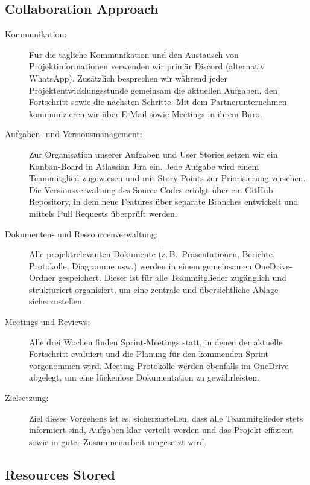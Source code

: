\documentclass{article}
\begin{document}
\subsection{Collaboration Approach}
\begin{description}
  \item[Kommunikation:] Für die tägliche Kommunikation und den Austausch von Projektinformationen verwenden wir primär Discord (alternativ WhatsApp). Zusätzlich besprechen wir während jeder Projektentwicklungsstunde gemeinsam die aktuellen Aufgaben, den Fortschritt sowie die nächsten Schritte. Mit dem Partnerunternehmen kommunizieren wir über E-Mail sowie Meetings in ihrem Büro.

  \item[Aufgaben- und Versionsmanagement:] Zur Organisation unserer Aufgaben und User Stories setzen wir ein Kanban-Board in Atlassian Jira ein. Jede Aufgabe wird einem Teammitglied zugewiesen und mit Story Points zur Priorisierung versehen. Die Versionsverwaltung des Source Codes erfolgt über ein GitHub-Repository, in dem neue Features über separate Branches entwickelt und mittels Pull Requests überprüft werden.

  \item[Dokumenten- und Ressourcenverwaltung:] Alle projektrelevanten Dokumente (z.\,B.\ Präsentationen, Berichte, Protokolle, Diagramme usw.) werden in einem gemeinsamen OneDrive-Ordner gespeichert. Dieser ist für alle Teammitglieder zugänglich und strukturiert organisiert, um eine zentrale und übersichtliche Ablage sicherzustellen.

  \item[Meetings und Reviews:] Alle drei Wochen finden Sprint-Meetings statt, in denen der aktuelle Fortschritt evaluiert und die Planung für den kommenden Sprint vorgenommen wird. Meeting-Protokolle werden ebenfalls im OneDrive abgelegt, um eine lückenlose Dokumentation zu gewährleisten.

  \item[Zielsetzung:] Ziel dieses Vorgehens ist es, sicherzustellen, dass alle Teammitglieder stets informiert sind, Aufgaben klar verteilt werden und das Projekt effizient sowie in guter Zusammenarbeit umgesetzt wird.
\end{description}




\subsection{Resources Stored}
\end{document}
